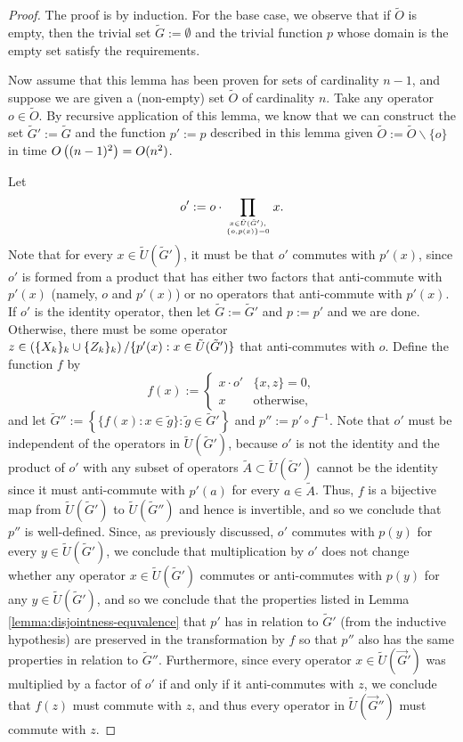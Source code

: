 \documentclass[twocolumn,showpacs,preprintnumbers,amsmath,amssymb,nofootinbib,pra,floatfix]{revtex4-1}
\newcommand{\lst}{\vec}
\newcommand{\set}{\tilde}
\begin{document}
\begin{proof}
The proof is by induction.  For the base case, we observe that if $\set O$ is empty, then the trivial set $\set G:=\emptyset$ and the trivial function $p$ whose domain is the empty set satisfy the requirements.

Now assume that this lemma has been proven for sets of cardinality $n-1$, and suppose we are given a (non-empty) set $\set O$ of cardinality $n$.  Take any operator $o\in\set O$.  By recursive application of this lemma, we know that we can construct the set $\set G':=\set G$ and the function $p':=p$ described in this lemma given $\set O:=\set O\backslash\{o\}$ in time $O\left((n-1)^2\right)=O(n^2)$.

Let $$o':=o\cdot \prod_{x\in\set U(\set G'),\atop\{o,p(x)\}=0} x.$$  Note that for every $x\in\set U(\set G')$, it must be that $o'$ commutes with $p'(x)$, since $o'$ is formed from a product that has either two factors that anti-commute with $p'(x)$ (namely, $o$ and $p'(x)$) or no operators that anti-commute with $p'(x)$.  If $o'$ is the identity operator, then let $\set G:=\set G'$ and $p:=p'$ and we are done.  Otherwise, there must be some operator $z\in\paren{\{X_k\}_k \cup \{Z_k\}_k}\slash\{p'(x):x\in\set U(\set G')\}$ that anti-commutes with $o$.  Define the function $f$ by
$$f(x) :=
\begin{cases}
x \cdot o' & \{x,z\}=0, \\
x          & \text{otherwise},
\end{cases}
$$
and let $\set G'':=\left\{\{f(x):x\in\set g\}:\set g\in\set G'\right\}$ and $p'':=p'\circ f^{-1}$.  Note that $o'$ must be independent of the operators in $\set U(\set G')$, because $o'$ is not the identity and the product of $o'$ with any subset of operators $\set A\subset\set U(\set G')$ cannot be the identity since it must anti-commute with $p'(a)$ for every $a\in\set A$.  Thus, $f$ is a bijective map from $\set U(\set G')$ to $\set U(\set G'')$ and hence is invertible, and so we conclude that $p''$ is well-defined.  Since, as previously discussed, $o'$ commutes with $p(y)$ for every $y\in\set U(\set G')$, we conclude that multiplication by $o'$ does not change whether any operator $x\in\set U(\set G')$ commutes or anti-commutes with $p(y)$ for any $y\in\set U(\set G')$, and so we conclude that the properties listed in Lemma \ref{lemma:disjointness-equvalence} that $p'$ has in relation to $\set G'$ (from the inductive hypothesis) are preserved in the transformation by $f$ so that $p''$ also has the same properties in relation to $\set G''$.  Furthermore, since every operator $x\in\set U(\lst G')$ was multiplied by a factor of $o'$ if and only if it anti-commutes with $z$, we conclude that $f(z)$ must commute with $z$, and thus every operator in $\set U(\lst G'')$ must commute with $z$.


\end{proof}
\end{document}
